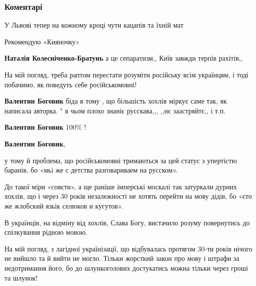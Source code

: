  
 
 
 
 
\subsubsection{Коментарі}
\label{sec:13_10_2021.fb.fb_group.pro_movu.1.detsad_kiev_mova.cmt}

\begin{itemize} %
У Львові тепер на кожному кроці чути кацапів та їхній мат

Рекомендую «Кияночку»

\begin{itemize} %
\textbf{Наталія Колесніченко-Братунь} а це сепаратизм,, Київ завжди терпів рахітів,,
\end{itemize} %

На мій погляд, треба раптом перестати розуміти російську всім українцям, і тоді
побачимо, як поведуть себе російськомовні!

\begin{itemize} %
\textbf{Валентин Боговик} біда в тому , що більшість хохлів міркує саме так, як написала авторка. " в чьом плохо знаніє русскава,,, ,,нє заастряйтє,, і т.п.

\textbf{Валентин Боговик} 100\% !

\textbf{Валентин Боговик}, 

у тому й проблема, що російськомовні тримаються за цей статус з упертістю
баранів, бо «мьі же с детства разговариваем на русском».

До такої міри «совєти», а ще раніше імперські москалі так затуркали дурних
хохлів, що і через 30 років незалежності не хотять перейти на мову дідів, бо
«єто же жлобский язьік селюков и кугутов».

В українців, на відміну від хохлів, Слава Богу, вистачило розуму повернутись до
спілкування рідною мовою.

На мій погляд, з лагідної українізації, що відбувалась протягом 30-ти років
нічого не вийшло та й вийти не могло. Тільки жорсткий закон про мову і штрафи
за недотримання його, бо до шлункоголових достукатись можна тільки через гроші
та шлунок!


\end{itemize}
\end{itemize}

